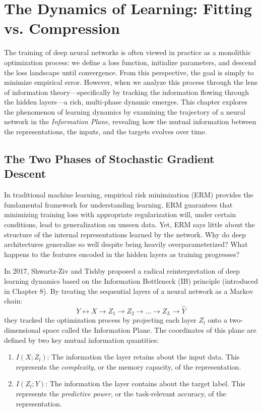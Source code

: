 \chapter{The Dynamics of Learning: Fitting vs. Compression}
\label{ch:learning_dynamics}

The training of deep neural networks is often viewed in practice as a monolithic optimization process: we define a loss function, initialize parameters, and descend the loss landscape until convergence. From this perspective, the goal is simply to minimize empirical error. However, when we analyze this process through the lens of information theory---specifically by tracking the information flowing through the hidden layers---a rich, multi-phase dynamic emerges. This chapter explores the phenomenon of learning dynamics by examining the trajectory of a neural network in the \textit{Information Plane}, revealing how the mutual information between the representations, the inputs, and the targets evolves over time.

\section{The Two Phases of Stochastic Gradient Descent}

In traditional machine learning, empirical risk minimization (ERM) provides the fundamental framework for understanding learning. ERM guarantees that minimizing training loss with appropriate regularization will, under certain conditions, lead to generalization on unseen data. Yet, ERM says little about the structure of the internal representations learned by the network. Why do deep architectures generalize so well despite being heavily overparameterized? What happens to the features encoded in the hidden layers as training progresses?

In 2017, Shwartz-Ziv and Tishby proposed a radical reinterpretation of deep learning dynamics based on the Information Bottleneck (IB) principle (introduced in Chapter 8). By treating the sequential layers of a neural network as a Markov chain:
\begin{equation}
    Y \leftrightarrow X \rightarrow Z_1 \rightarrow Z_2 \rightarrow \dots \rightarrow Z_L \rightarrow \hat{Y}
\end{equation}
they tracked the optimization process by projecting each layer $Z_l$ onto a two-dimensional space called the Information Plane. The coordinates of this plane are defined by two key mutual information quantities:
\begin{enumerate}
    \item $I(X; Z_l)$: The information the layer retains about the input data. This represents the \textit{complexity}, or the memory capacity, of the representation. 
    \item $I(Z_l; Y)$: The information the layer contains about the target label. This represents the \textit{predictive power}, or the task-relevant accuracy, of the representation.
\end{enumerate}

